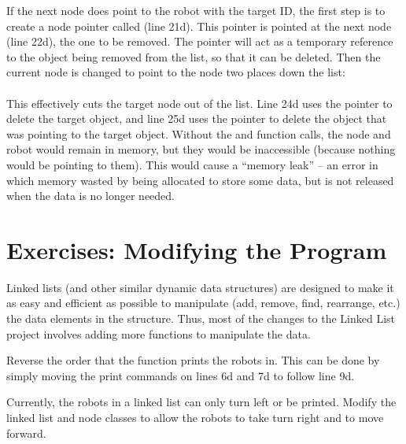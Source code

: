 If the next node does point to the robot with the target ID, the first step is to create a node pointer called  (line 21d).  This pointer is pointed at the next node (line 22d), the one to be removed.  The  pointer will act as a temporary reference to the  object being removed from the list, so that it can be deleted.  Then the current node is changed to point to the node two places down the list:\\
\\
This effectively cuts the target node out of the list.  Line 24d uses the  pointer to delete the target  object, and line 25d uses the  pointer to delete the  object that was pointing to the target  object.  Without the  and  function calls, the node and robot would remain in memory, but they would be inaccessible (because nothing would be pointing to them).  This would cause a ``memory leak'' -- an error in which memory wasted by being allocated to store some data, but is not released when the data is no longer needed.

\vspace{+0.25cm}
{\color{\mycolor}\noindent\hrulefill}
\section{Exercises: Modifying the Program}

Linked lists (and other similar dynamic data structures) are designed to make it as easy and efficient as possible to manipulate (add, remove, find, rearrange, etc.) the data elements in the structure.  Thus, most of the changes to the Linked List project involves adding more functions to manipulate the data.


Reverse the order that the  function prints the robots in.  This can be done by simply moving the print commands on lines 6d and 7d to follow line 9d.  



Currently, the robots in a linked list can only turn left or be printed.  Modify the linked list and node classes to allow the robots to take turn right and to move forward.


